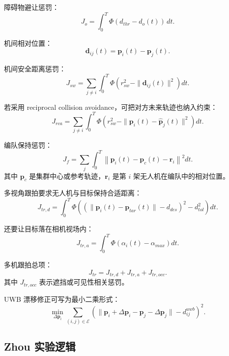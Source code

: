 ﻿\documentclass[UTF8,a4paper,11pt]{ctexart}
\begin{document}
障碍物避让惩罚：
\begin{equation}
J_o=\int_0^T\Phi(d_{thr}-d_o(t))\,dt .
\tag{16}
\end{equation}

机间相对位置：
\begin{equation}
\bm d_{ij}(t)=\bm p_i(t)-\bm p_j(t).
\tag{17}
\end{equation}

机间安全距离惩罚：
\begin{equation}
J_{sw}=\sum_{j\neq i}\int_0^T
\Phi\left(r_{sw}^2-\|\bm d_{ij}(t)\|^2\right)dt .
\tag{18}
\end{equation}

若采用 reciprocal collision avoidance，可把对方未来轨迹也纳入约束：
\begin{equation}
J_{rca}=\sum_{j\neq i}\int_0^T
\Phi\left(r_{sw}^2-\|\bm p_i(t)-\hat{\bm p}_j(t)\|^2\right)dt .
\tag{19}
\end{equation}

编队保持惩罚：
\begin{equation}
J_f=\sum_{j}\int_0^T
\left\|
\bm p_i(t)-\bm p_c(t)-\bm r_i
\right\|^2dt .
\tag{20}
\end{equation}
其中 $\bm p_c$ 是集群中心或参考轨迹，$\bm r_i$ 是第 $i$ 架无人机在编队中的相对位置。

多视角跟拍要求无人机与目标保持合适距离：
\begin{equation}
J_{tr,d}=\int_0^T
\Phi\left((\|\bm p_i(t)-\bm p_{tar}(t)\|-d_{des})^2-d_{tol}^2\right)dt .
\tag{21}
\end{equation}

还要让目标落在相机视场内：
\begin{equation}
J_{tr,a}=\int_0^T
\Phi\left(\alpha_i(t)-\alpha_{max}\right)dt .
\tag{22}
\end{equation}

多机跟拍总项：
\begin{equation}
J_{tr}=J_{tr,d}+J_{tr,a}+J_{tr,occ}.
\tag{23}
\end{equation}
其中 $J_{tr,occ}$ 表示遮挡或可见性相关惩罚。

UWB 漂移修正可写为最小二乘形式：
\begin{equation}
\min_{\Delta\bm p_i}
\sum_{(i,j)\in\mathcal E}
\left(
\|\bm p_i+\Delta\bm p_i-\bm p_j-\Delta\bm p_j\|-d_{ij}^{uwb}
\right)^2 .
\tag{24}
\end{equation}

\subsection{Zhou 实验逻辑}
\end{document}
